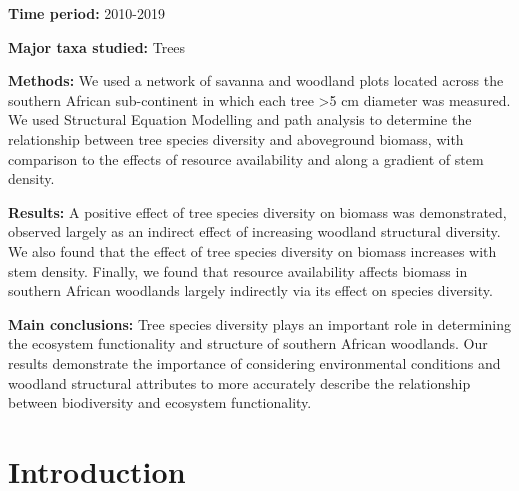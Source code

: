 \documentclass[11pt,a4paper]{article}
\begin{document}
\textbf{Time period:} 2010-2019

\textbf{Major taxa studied:} Trees

\textbf{Methods:} We used a network of \nplots{} savanna and woodland plots located across the southern African sub-continent in which each tree >5 cm diameter was measured. We used Structural Equation Modelling and path analysis to determine the relationship between tree species diversity and aboveground biomass, with comparison to the effects of resource availability and along a gradient of stem density.

\textbf{Results:} A positive effect of tree species diversity on biomass was demonstrated, observed largely as an indirect effect of increasing woodland structural diversity. We also found that the effect of tree species diversity on biomass increases with stem density. Finally, we found that resource availability affects biomass in southern African woodlands largely indirectly via its effect on species diversity.

\textbf{Main conclusions:} Tree species diversity plays an important role in determining the ecosystem functionality and structure of southern African woodlands. Our results demonstrate the importance of considering environmental conditions and woodland structural attributes to more accurately describe the relationship between biodiversity and ecosystem functionality.


\section*{Introduction}
\end{document}
